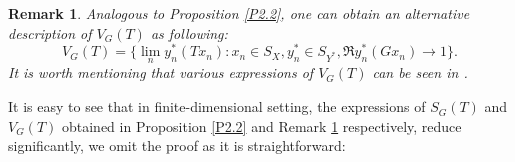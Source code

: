 \documentclass[12pt]{amsart}
\newtheorem{remark}[theorem]{Remark}
\theoremstyle{definition}
\numberwithin{equation}{section}
\begin{document}
	
	
		
		
		
		
	
	\begin{remark}\label{R2.4}
		Analogous to Proposition \ref{P2.2}, one can obtain an alternative description of $V_G(T)$ as following:
		\[
		V_G(T)=\Big\{\lim_{n} y_n^*(Tx_n):x_n\in S_X, y_n^*\in S_{Y^*}, \Re y_n^*(Gx_n)\to 1 \Big\}.
		\]
        It is worth mentioning that various expressions of $V_G(T)$ can be seen in \cite{MMQRS}.
	\end{remark}
	
	It is easy to see that in finite-dimensional setting, the expressions of $S_G(T)$ and $V_G(T)$ obtained in Proposition \ref{P2.2} and Remark \ref{R2.4} respectively, reduce significantly, we omit the proof as it is straightforward:
	
\end{document}

